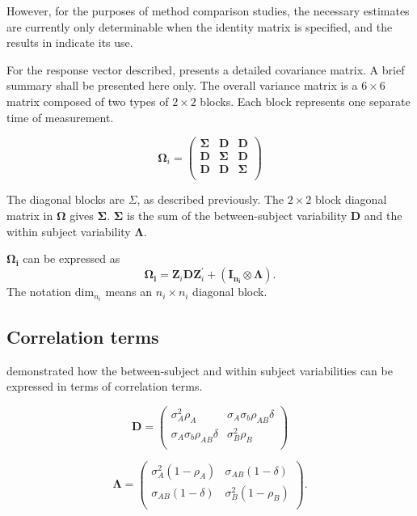 \documentclass[12pt, a4paper]{report}
\theoremstyle{plain}
\theoremstyle{definition}
\theoremstyle{remark}
\begin{document}
	However, for the purposes of method comparison studies, the necessary estimates are currently only determinable when the identity matrix is specified, and the results in \citet{ARoy2009} indicate its use.
	
	For the response vector described, \citet{hamlett} presents a detailed covariance matrix. A brief summary shall be presented here only. The overall variance matrix is a $6 \times 6$ matrix composed of two types of $2 \times 2$ blocks. Each block represents one separate time of measurement.
	
	\[
	\boldsymbol{\Omega}_{i} = \left(
	\begin{array}{ccc}
	\boldsymbol{\Sigma} & \boldsymbol{D} & \boldsymbol{D}\\
	\boldsymbol{D} & \boldsymbol{\Sigma} & \boldsymbol{D}\\
	\boldsymbol{D} & \boldsymbol{D} & \boldsymbol{\Sigma}\\
	\end{array}\right)
	\]
	
	The diagonal blocks are $\Sigma$, as described previously. The $2 \times 2$ block diagonal matrix in $\boldsymbol{\Omega}$ gives $\boldsymbol{\Sigma}$. $\boldsymbol{\Sigma}$ is the sum of the between-subject variability $\boldsymbol{D}$ and the within subject variability $\boldsymbol{\Lambda}$.
	
	$\boldsymbol{\Omega_{i}}$ can be expressed as
	\[
	\boldsymbol{\Omega_{i}} = \boldsymbol{Z}_{i}\boldsymbol{D}\boldsymbol{Z}_{i}^\prime + ({\boldsymbol{I_{n_{i}}} \otimes \boldsymbol{\Lambda}}).
	\]
	The notation $\mbox{dim}_{n_{i}}$ means an $n_{i} \times n_{i}$ diagonal block.
	
	\subsection{Correlation terms}
	\citet{hamlett} demonstrated how the between-subject and within subject variabilities can be expressed in terms of
	correlation terms.
	
	\[
	\boldsymbol{D} = \left( \begin{array}{cc}
	\sigma^2_{A}\rho_{A} & \sigma_{A}\sigma_{b}\rho_{AB}\delta \\
	\sigma_{A}\sigma_{b}\rho_{AB}\delta & \sigma^2_{B}\rho_{B}\\
	
	\end{array}\right)
	\]
	
	\[
	\boldsymbol{\Lambda} = \left(
	\begin{array}{cc}
	\sigma^2_{A}(1-\rho_{A}) & \sigma_{AB}(1-\delta)  \\
	\sigma_{AB}(1-\delta) & \sigma^2_{B}(1-\rho_{B}) \\
	\end{array}\right).
	\]
	
\end{document}
